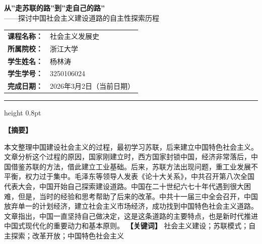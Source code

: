 \documentclass[12pt, a4paper]{ctexart}
\numberwithin{table}{section}
\numberwithin{figure}{section}
\begin{document}
\thispagestyle{empty} %

\begin{center}
    \vspace*{1em}
    \begin{tcolorbox}[
      colback=red!2, colframe=red!40!black,
      arc=3mm, boxrule=1pt,
      width=0.92\textwidth,
      top=15pt, bottom=15pt,
      halign=center
    ]
    {\heiti {} \textbf{从”走苏联的路”到”走自己的路”}} \\[0.8em]
    {\kaishu {} ——探讨中国社会主义建设道路的自主性探索历程}
    \end{tcolorbox}
    \vspace{2em}

    {
    \renewcommand{\arraystretch}{1.5}
    \begin{tabular}{rl}
        \textbf{课程名称：} & 社会主义发展史 \\
        \textbf{所属院校：} & 浙江大学 \\
        \textbf{学生姓名：} & 杨林涛 \\
        \textbf{学生学号：} & 3250106024 \\
        \textbf{完成日期：} & 2026年3月2日（当前日期） \\
    \end{tabular}
    }
\end{center}
\vspace{2em}
{\color{red!40!black}\hrule height 0.8pt}
\vspace{2em}
\begin{abstractbox}
    {\kaishu {}
    \centerline{\heiti\textbf{【摘\quad 要】}}
    \vspace{0.3em}
    本文整理中国建设社会主义的过程，最初学习苏联，后来建立中国特色社会主义。文章分析这个过程的原因，国家刚建立时，西方国家封锁中国，经济非常落后，中国借鉴苏联的方法，借此建立工业基础。后来，苏联方法出现问题，重工业发展不平衡，权力过于集中。毛泽东等领导人发表《论十大关系》，中共召开第八次全国代表大会，中国开始自己探索建设道路。中国在二十世纪六七十年代遇到很大困难，但是，当时的经验和思考帮助了后来的改革。中共十一届三中全会召开，中国放弃单一的计划经济，建立社会主义市场经济，成功找到中国特色社会主义道路。文章指出，中国一直坚持自己做决定，这是这条道路的主要特点，也是新时代推进中国式现代化的重要动力和基本原则。
    \vspace{0.5em}
    \newline
    \textbf{【关键词】} 社会主义建设；苏联模式；自主探索；改革开放；中国特色社会主义
    }
\end{abstractbox}
\end{document}
